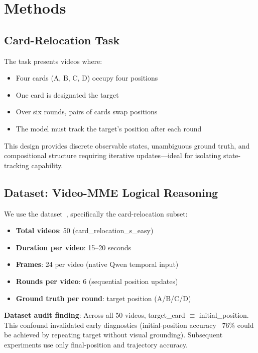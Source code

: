 \section{Methods}
\label{sec:methods}

\subsection{Card-Relocation Task}

The task presents videos where:
\begin{itemize}
    \item Four cards (A, B, C, D) occupy four positions
    \item One card is designated the target
    \item Over six rounds, pairs of cards swap positions
    \item The model must track the target's position after each round
\end{itemize}

This design provides discrete observable states, unambiguous ground truth, and compositional structure requiring iterative updates---ideal for isolating state-tracking capability.

\subsection{Dataset: Video-MME Logical Reasoning}

We use the  dataset~\cite{fu2024video}, specifically the card-relocation subset:
\begin{itemize}
    \item \textbf{Total videos}: 50 (card\_relocation\_s\_easy)
    \item \textbf{Duration per video}: 15--20 seconds
    \item \textbf{Frames}: 24 per video (native Qwen temporal input)
    \item \textbf{Rounds per video}: 6 (sequential position updates)
    \item \textbf{Ground truth per round}: target position (A/B/C/D)
\end{itemize}

\textbf{Dataset audit finding}: Across all 50 videos, target\_card $\equiv$ initial\_position. This confound invalidated early diagnostics (initial-position accuracy ~76\% could be achieved by repeating target without visual grounding). Subsequent experiments use only final-position and trajectory accuracy.

